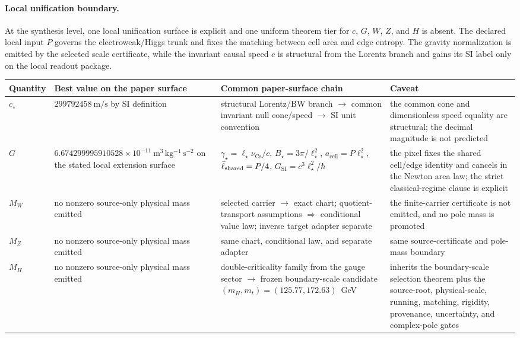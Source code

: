 \paragraph{Local unification boundary.}
At the synthesis level, one local unification surface is explicit and one uniform theorem tier for
\(c\), \(G\), \(W\), \(Z\), and \(H\) is absent. The declared local input \(P\) governs the
electroweak/Higgs trunk and fixes the matching between cell area and edge entropy. The gravity
normalization is emitted by the selected scale certificate, while the invariant
causal speed \(c\) is structural from the Lorentz branch and gains its SI label only on the local
readout package.

{\centering
\scriptsize
\setlength{\tabcolsep}{3pt}
\begin{tabular}{@{}>{\raggedright\arraybackslash}p{}>{\raggedright\arraybackslash}p{}>{\raggedright\arraybackslash}p{}>{\raggedright\arraybackslash}p{}@{}}
\toprule
Quantity & Best value on the paper surface & Common paper-surface chain & Caveat \\
\midrule
\(c_\star\) & \(299792458~\mathrm{m/s}\) by SI definition & structural Lorentz/BW branch \(\rightarrow\) common invariant null cone/speed \(\rightarrow\) SI unit convention & the common cone and dimensionless speed equality are structural; the decimal magnitude is not predicted \\
\(G\) & \(6.674299995910528\times10^{-11}~\mathrm{m^3\,kg^{-1}\,s^{-2}}\) on the stated local extension surface & \(\gamma_\star=\ell_\star\nu_{\mathrm{Cs}}/c\), \(B_\star=3\pi/\ell_\star^2\), \(a_{\mathrm{cell}}=P\ell_\star^2\), \(\bar{\ell}_{\mathrm{shared}}=P/4\), \(G_{\mathrm{SI}}=c^3\ell_\star^2/\hbar\) & the pixel fixes the shared cell/edge identity and cancels in the Newton area law; the strict classical-regime clause is explicit \\
\(M_W\) & no nonzero source-only physical mass emitted & selected carrier \(\rightarrow\) exact chart; quotient-transport assumptions \(\Rightarrow\) conditional value law; inverse target adapter separate & the finite-carrier certificate is not emitted, and no pole mass is promoted \\
\(M_Z\) & no nonzero source-only physical mass emitted & same chart, conditional law, and separate adapter & same source-certificate and pole-mass boundary \\
\(M_H\) & no nonzero source-only physical mass emitted & double-criticality family from the gauge sector \(\rightarrow\) frozen boundary-scale candidate \((m_H,m_t)=(125.77,172.63)\)~GeV & inherits the boundary-scale selection theorem plus the source-root, physical-scale, running, matching, rigidity, provenance, uncertainty, and complex-pole gates \\
\bottomrule
\end{tabular}
\par}

